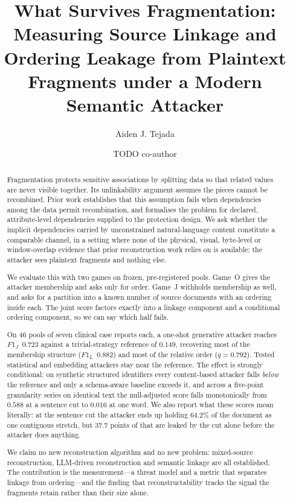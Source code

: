 \documentclass[sigconf,nonacm]{acmart}
\newcommand{\FJ}{\ensuremath{F1_J}}
\newcommand{\FL}{\ensuremath{F1_L}}
\begin{document}
\title{What Survives Fragmentation: Measuring Source Linkage and Ordering
Leakage from Plaintext Fragments under a Modern Semantic Attacker}

\author{Aiden J. Tejada}
\author{TODO co-author}

\begin{abstract}
Fragmentation protects sensitive associations by splitting data so that related
values are never visible together. Its unlinkability argument assumes the pieces
cannot be recombined. Prior work establishes that this assumption fails when
dependencies among the data permit recombination, and formalises the problem for
declared, attribute-level dependencies supplied to the protection design. We ask
whether the implicit dependencies carried by unconstrained natural-language
content constitute a comparable channel, in a setting where none of the physical,
visual, byte-level or window-overlap evidence that prior reconstruction work
relies on is available: the attacker sees plaintext fragments and nothing else.

We evaluate this with two games on frozen, pre-registered pools. Game~O gives the
attacker membership and asks only for order. Game~J withholds membership as well,
and asks for a partition into a known number of source documents with an ordering
inside each. The joint score factors exactly into a linkage component and a
conditional ordering component, so we can say which half fails.

On 46 pools of seven clinical case reports each, a one-shot generative attacker
reaches \FJ~$0.723$ against a trivial-strategy reference of $0.149$, recovering
most of the membership structure (\FL~$0.882$) and most of the relative order
($q=0.792$). Tested statistical and embedding attackers stay near the reference.
The effect is strongly conditional: on synthetic structured identifiers every
content-based attacker falls \emph{below} the reference and only a schema-aware
baseline exceeds it, and across a five-point granularity series on identical text
the null-adjusted score falls monotonically from $0.588$ at a sentence cut to
$0.016$ at one word. We also report what these scores mean literally: at the
sentence cut the attacker ends up holding $64.2\%$ of the document as one
contiguous stretch, but $37.7$ points of that are leaked by the cut alone before
the attacker does anything.

We claim no new reconstruction algorithm and no new problem: mixed-source
reconstruction, LLM-driven reconstruction and semantic linkage are all
established. The contribution is the measurement---a threat model and a metric
that separates linkage from ordering---and the finding that reconstructability
tracks the signal the fragments retain rather than their size alone.
\end{abstract}
\end{document}
